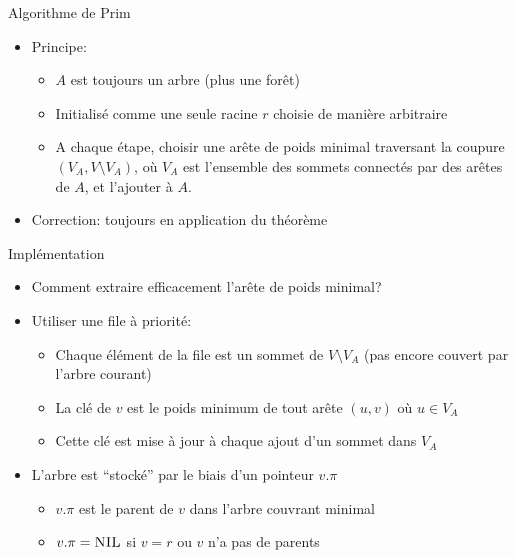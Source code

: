 \begin{frame}{Algorithme de Prim}

\begin{itemize}
\item Principe:
\begin{itemize}
\item $A$ est toujours un arbre (plus une forêt)
\item Initialisé comme une seule racine $r$ choisie de manière arbitraire
\item A chaque étape, choisir une arête de poids minimal traversant la
  coupure $(V_A,V\setminus V_A)$, où $V_A$ est l'ensemble des sommets
  connectés par des arêtes de $A$, et l'ajouter à $A$.
\end{itemize}

\bigskip

\begin{center}
{\small
{}
}
\end{center}

\bigskip

\item Correction: toujours en application du théorème
\end{itemize}

\end{frame}

\begin{frame}{Implémentation}

\begin{itemize}
\item Comment extraire efficacement l'arête de poids minimal?
\item Utiliser une file à priorité:
\begin{itemize}
\item Chaque élément de la file est un sommet de $V\setminus V_A$ (pas
  encore couvert par l'arbre courant)
\item La clé de $v$ est le poids minimum de tout arête $(u,v)$ où $u\in V_A$
\item Cette clé est mise à jour à chaque ajout d'un sommet dans $V_A$
\end{itemize}

\bigskip

\item L'arbre est ``stocké'' par le biais d'un pointeur $v.\pi$
\begin{itemize}
\item $v.\pi$ est le parent de $v$ dans l'arbre couvrant minimal
\item $v.\pi=\textnormal{\scshape NIL}$ si $v=r$ ou $v$ n'a pas de parents
\end{itemize}
\end{itemize}

\end{frame}

